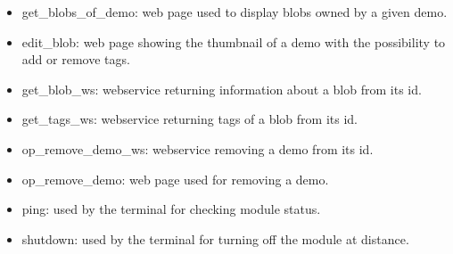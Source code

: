 \begin{itemize}
\item get\_blobs\_of\_demo: web page used to display blobs owned by a given demo.
\item edit\_blob: web page showing the thumbnail of a demo with the possibility to add or remove tags.
\item get\_blob\_ws: webservice returning information about a blob from its id.
\item get\_tags\_ws: webservice returning tags of a blob from its id.
\item op\_remove\_demo\_ws: webservice removing a demo from its id.
\item op\_remove\_demo: web page used for removing a demo.
\item ping: used by the terminal for checking module status.
\item shutdown: used by the terminal for turning off the module at distance.
  
\end{itemize}
